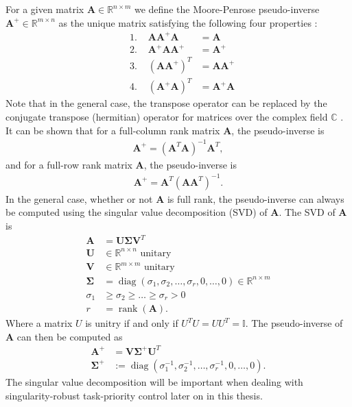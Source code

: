 For a given matrix $\bm{A} \in \mathbb{R}^{n\times m}$ we define the Moore-Penrose
pseudo-inverse $\bm{A}^{+} \in \mathbb{R}^{m\times n}$ as the unique matrix
satisfying the following four properties \cite{penrose1955}:
\begin{subequations}
    \begin{align}
        &\textrm{1. } & \bm{A}\bm{A}^{+}\bm{A} &= \bm{A} \\
        &\textrm{2. } & \bm{A}^{+}\bm{A}\bm{A}^{+} &= \bm{A}^{+} \\
        &\textrm{3. } & (\bm{A}\bm{A}^{+})^T &= \bm{A}\bm{A}^{+} \\
        &\textrm{4. } & (\bm{A}^{+}\bm{A})^T &= \bm{A}^{+}\bm{A}
    \end{align}
\end{subequations}
Note that in the general case, the transpose operator can be replaced by the
conjugate transpose (hermitian) operator for matrices over the complex field $\mathbb{C}$ \cite{penrose1955}.
It can be shown that for a full-column rank matrix $\bm{A}$, the pseudo-inverse is
\begin{align}
    \bm{A}^{+} = (\bm{A}^T \bm{A})^{-1} \bm{A}^T,
\end{align}
and for a full-row rank matrix $\bm{A}$, the pseudo-inverse is
\begin{align}
    \bm{A}^{+} = \bm{A}^T (\bm{A} \bm{A}^T)^{-1}.
\end{align}
In the general case, whether or not $\bm{A}$ is full rank, the pseudo-inverse can always
be computed using the singular value decomposition (SVD) of $\bm{A}$. The SVD of $\bm{A}$ is
\begin{subequations}
\begin{align}
    \bm{A} &= \bm{U} \bm{\Sigma} \bm{V}^T \\
    \bm{U} &\in \mathbb{R}^{n\times n} \textrm{ unitary} \\
    \bm{V} &\in \mathbb{R}^{m\times m} \textrm{ unitary} \\
    \bm{\Sigma} &= \operatorname{diag}(\sigma_1, \sigma_2, \ldots, \sigma_r, 0, \ldots, 0) \in \mathbb{R}^{n\times m} \\
    \sigma_1 &\geq \sigma_2 \geq \ldots \geq \sigma_r > 0 \\
    r &= \operatorname{rank}(\bm{A}).
\end{align}
\end{subequations}
Where a matrix $U$ is unitry if and only if $U^T U = U U^T = \mathbb{I}$. The pseudo-inverse
of $\bm{A}$ can then be computed as
\begin{subequations}
\begin{align}
    \bm{A}^{+} &= \bm{V} \bm{\Sigma}^{+} \bm{U}^T \\
    \bm{\Sigma}^{+} &:= \operatorname{diag}(\sigma_1^{-1}, \sigma_2^{-1}, \ldots, \sigma_r^{-1}, 0, \ldots, 0).
\end{align}
\end{subequations}
The singular value decomposition will be important when dealing with
singularity-robust task-priority control later on in this thesis.

